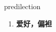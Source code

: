 
\begin{frame}
{\huge predilection}
\begin{center}
\begin{enumerate}\Large
  \item \textbf{爱好，偏袒}
\end{enumerate}
\end{center}
\end{frame}
